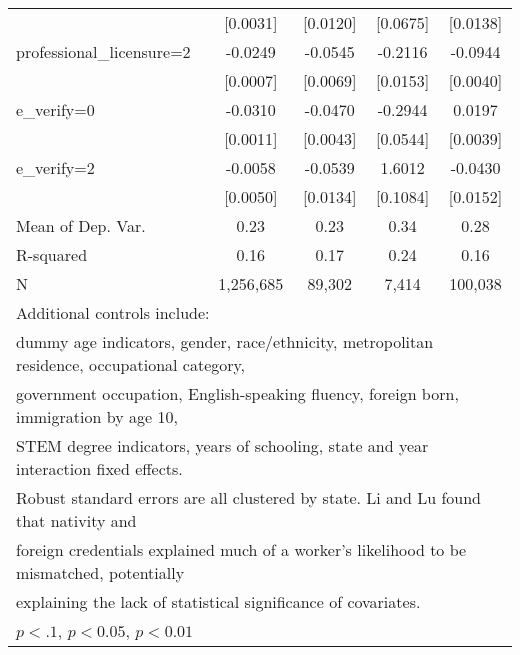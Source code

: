 \begin{table}[htbp]
\begin{tabular}{l*{4}{c}}
                    &    [0.0031]         &    [0.0120]         &    [0.0675]         &    [0.0138]         \\
\addlinespace
professional\_licensure=2&     -0.0249\sym{***}&     -0.0545\sym{***}&     -0.2116\sym{***}&     -0.0944\sym{***}\\
                    &    [0.0007]         &    [0.0069]         &    [0.0153]         &    [0.0040]         \\
\addlinespace
e\_verify=0          &     -0.0310\sym{***}&     -0.0470\sym{***}&     -0.2944\sym{***}&      0.0197\sym{***}\\
                    &    [0.0011]         &    [0.0043]         &    [0.0544]         &    [0.0039]         \\
\addlinespace
e\_verify=2          &     -0.0058         &     -0.0539\sym{***}&      1.6012\sym{***}&     -0.0430\sym{***}\\
                    &    [0.0050]         &    [0.0134]         &    [0.1084]         &    [0.0152]         \\
\midrule
Mean of Dep. Var.   &        0.23         &        0.23         &        0.34         &        0.28         \\
R-squared           &        0.16         &        0.17         &        0.24         &        0.16         \\
N                   &   1,256,685         &      89,302         &       7,414         &     100,038         \\
\bottomrule
\multicolumn{5}{l}{\footnotesize Additional controls include:}\\
\multicolumn{5}{l}{\footnotesize dummy age indicators, gender, race/ethnicity, metropolitan residence, occupational category,}\\
\multicolumn{5}{l}{\footnotesize government occupation, English-speaking fluency, foreign born, immigration by age 10,}\\
\multicolumn{5}{l}{\footnotesize STEM degree indicators, years of schooling, state and year interaction fixed effects.}\\
\multicolumn{5}{l}{\footnotesize Robust standard errors are all clustered by state. Li and Lu found that nativity and}\\
\multicolumn{5}{l}{\footnotesize foreign credentials explained much of a worker's likelihood to be mismatched, potentially}\\
\multicolumn{5}{l}{\footnotesize explaining the lack of statistical significance of covariates.}\\
\multicolumn{5}{l}{\footnotesize \sym{*} \(p<.1\), \sym{**} \(p<0.05\), \sym{***} \(p<0.01\)}\\
\end{tabular}
\end{table}
